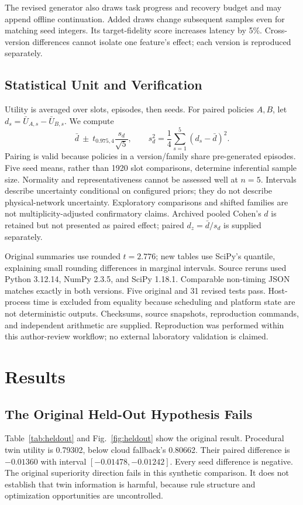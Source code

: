 The revised generator also draws task progress and recovery budget and may append offline continuation. Added draws change subsequent samples even for matching seed integers. Its target-fidelity score increases latency by 5\%. Cross-version differences cannot isolate one feature's effect; each version is reproduced separately.

\subsection{Statistical Unit and Verification}
Utility is averaged over slots, episodes, then seeds. For paired policies $A,B$, let $d_s=\bar U_{A,s}-\bar U_{B,s}$. We compute
\begin{equation}
\bar d\ \pm\ t_{0.975,4}\frac{s_d}{\sqrt5},\qquad
s_d^2=\frac{1}{4}\sum_{s=1}^5(d_s-\bar d)^2.\label{eq:ci}
\end{equation}
Pairing is valid because policies in a version/family share pre-generated episodes. Five seed means, rather than 1920 slot comparisons, determine inferential sample size. Normality and representativeness cannot be assessed well at $n=5$. Intervals describe uncertainty conditional on configured priors; they do not describe physical-network uncertainty. Exploratory comparisons and shifted families are not multiplicity-adjusted confirmatory claims. Archived pooled Cohen's $d$ is retained but not presented as paired effect; paired $d_z=\bar d/s_d$ is supplied separately.

Original summaries use rounded $t=2.776$; new tables use SciPy's quantile, explaining small rounding differences in marginal intervals. Source reruns used Python 3.12.14, NumPy 2.3.5, and SciPy 1.18.1. Comparable non-timing JSON matches exactly in both versions. Five original and 31 revised tests pass. Host-process time is excluded from equality because scheduling and platform state are not deterministic outputs. Checksums, source snapshots, reproduction commands, and independent arithmetic are supplied. Reproduction was performed within this author-review workflow; no external laboratory validation is claimed.

\section{Results}
\subsection{The Original Held-Out Hypothesis Fails}
Table~\ref{tab:heldout} and Fig.~\ref{fig:heldout} show the original result. Procedural twin utility is 0.79302, below cloud fallback's 0.80662. Their paired difference is $-0.01360$ with interval $[-0.01478,-0.01242]$. Every seed difference is negative. The original superiority direction fails in this synthetic comparison. It does not establish that twin information is harmful, because rule structure and optimization opportunities are uncontrolled.

